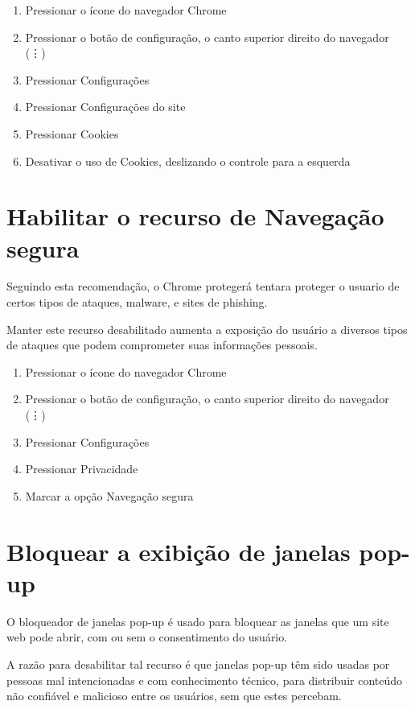 \begin{enumerate}
\item Pressionar o \'icone do navegador Chrome
\item Pressionar o bot\~ao de configura\c c\~ao, o canto superior direito do navegador (\vdots)
\item Pressionar Configura\c c\~oes
\item Pressionar Configura\c c\~oes do site
\item Pressionar Cookies
\item Desativar o uso de Cookies, deslizando o controle para a esquerda
\end{enumerate}

\section{Habilitar o recurso de Navega\c c\~ao segura}

Seguindo esta recomenda\c c\~ao, o Chrome proteger\'a tentara proteger o usuario de certos tipos de ataques, malware, e sites de phishing.

Manter este recurso desabilitado aumenta a exposi\c c\~ao do usu\'ario a diversos tipos de ataques que podem comprometer suas informa\c c\~oes pessoais.

\begin{enumerate}
\item Pressionar o \'icone do navegador Chrome
\item Pressionar o bot\~ao de configura\c c\~ao, o canto superior direito do navegador (\vdots)
\item Pressionar Configura\c c\~oes
\item Pressionar Privacidade
\item Marcar a op\c c\~ao Navega\c c\~ao segura
\end{enumerate}

\section{Bloquear a exibi\c c\~ao de janelas pop-up}

O bloqueador de janelas pop-up \'e usado para bloquear as janelas que um site web pode abrir, com ou sem o consentimento do usu\'ario. 

A raz\~ao para desabilitar tal recurso \'e que janelas pop-up t\^em sido usadas por pessoas mal intencionadas e com conhecimento t\'ecnico, para distribuir conte\'udo n\~ao confi\'avel e malicioso entre os usu\'arios, sem que estes percebam.

